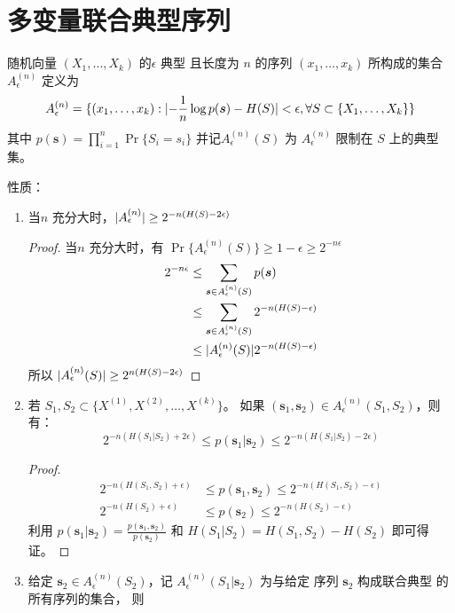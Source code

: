 \documentclass{article}
\DeclarePairedDelimiter\abs{\lvert}{\rvert}
\begin{document}
\section{多变量联合典型序列}
随机向量 $(X_1, \dots, X_k) $ 的$\epsilon $ 典型 且长度为
$n$ 的序列 $ (x_1, \dots, x_k) $ 所构成的集合 $ A_{\epsilon}^{(n)} $ 定义为
$$
A_{\epsilon}^{(n)} = \{ (x_1, \dots, x_k): \abs{ -{ 1 \over n} \log p(\bm{s}) - H(S)} < \epsilon,
\forall S \subset \{X_1, \dots, X_k\}
\}
$$
其中 $ p(\bm{s}) = \prod_{i=1}^n \Pr\{S_i = s_i\} $
并记$ A_{\epsilon}^{(n)}(S) $ 为 $A_{\epsilon}^{(n)}$ 限制在 $S$ 上的典型集。

性质：
\begin{enumerate}
\item 当$ n$ 充分大时，$ \abs{A_{\epsilon}^{(n)} } \geq 2^{-n(H(S)-2\epsilon)} $
\begin{proof}
当$ n$ 充分大时，有 $\Pr\{A_{\epsilon}^{(n)}(S)\} \geq 1 - \epsilon \geq 2^{-n \epsilon}$
\begin{align}
2^{-n \epsilon} & \leq \sum_{\bm{s} \in A_{\epsilon}^{(n)}(S)} p(\bm{s})  \\
& \leq \sum_{\bm{s} \in A_{\epsilon}^{(n)}(S)} 2^{- n (H(S)-\epsilon)} \\
& \leq \abs{A_{\epsilon}^{(n)}(S)} 2^{- n (H(S)-\epsilon)}
\end{align}
所以 $\abs{A_{\epsilon}^{(n)}(S)} \geq 2^{n(H(S) - 2\epsilon)}$
\end{proof}
\item 若 $ S_1, S_2 \subset \{ X^{(1)}, X^{(2)}, \dots, X^{(k)} \} $。 如果 $(\bm{s}_1, \bm{s}_2)
\in A_{\epsilon}^{(n)}(S_1,S_2)$，则有：
\begin{equation}
\label{eq: s1_c_s2} 2^{-n(H(S_1 | S_2) + 2\epsilon)} \leq p(\bm{s}_1 | \bm{s}_2 ) \leq 2^{-n(H(S_1 | S_2) - 2\epsilon)}
\end{equation}
\begin{proof}
\begin{align}
2^{-n(H(S_1, S_2) + \epsilon)} & \leq p(\bm{s}_1, \bm{s}_2) \leq 2^{-n(H(S_1, S_2) - \epsilon)} \\
2^{-n(H(S_2) + \epsilon)} & \leq p(\bm{s}_2) \leq 2^{-n(H(S_2) - \epsilon)} 
\end{align}
利用 $ p(\bm{s}_1 | \bm{s}_2) = \frac{p(\bm{s}_1, \bm{s}_2)}{p(\bm{s}_2)} $
 和 $ H(S_1 | S_2) = H(S_1,S_2) - H(S_2)$ 即可得证。
\end{proof}
\item 给定 $\bm{s}_2 \in A_{\epsilon}^{(n)}(S_2)$，记 $A_{\epsilon}^{(n)}(S_1 | \bm{s}_2)$ 为与给定
序列 $\bm{s}_2 $  构成联合典型 的所有序列的集合， 则

\end{enumerate}
\end{document}
